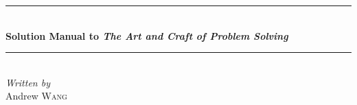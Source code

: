 \documentclass[11pt]{article}
\begin{document}

\begin{titlepage} %
	\newcommand{\HRule}{\rule{\linewidth}{0.5mm}} %
	
	\center %

	\vspace*{50px}

	
	\HRule\\[0.4cm]
	
	{\huge\bfseries Solution Manual to \textit{The Art and Craft of Problem Solving}}\\[0.4cm] %
	
	\HRule\\[1.5cm]
	
	
	
	{\large\textit{Written by}}\\
	Andrew \textsc{Wang} %
	
	

\end{titlepage}
\end{document}
